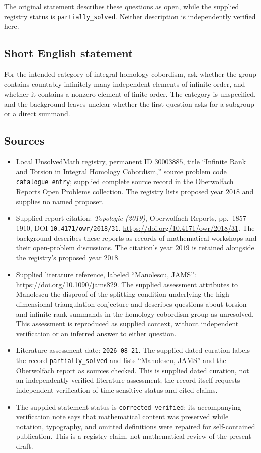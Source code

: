 \documentclass[11pt]{article}
\begin{document}
The original statement describes these questions as open, while the supplied registry status is \texttt{partially\_solved}. Neither description is independently verified here.
\subsection{Short English statement}
For the intended category of integral homology cobordism, ask whether the group contains countably infinitely many independent elements of infinite order, and whether it contains a nonzero element of finite order. The category is unspecified, and the background leaves unclear whether the first question asks for a subgroup or a direct summand.
\subsection{Sources}
\begin{itemize}
\item Local UnsolvedMath registry, permanent ID \(30003885\), title ``Infinite Rank and Torsion in Integral Homology Cobordism,'' source problem code \texttt{catalogue entry}; supplied complete source record in the Oberwolfach Reports Open Problems collection. The registry lists proposed year \(2018\) and supplies no named proposer.
\item Supplied report citation: \emph{Topologie (2019)}, Oberwolfach Reports, pp.\ 1857--1910, DOI \texttt{10.4171/owr/2018/31}. \url{https://doi.org/10.4171/owr/2018/31}. The background describes these reports as records of mathematical workshops and their open-problem discussions. The citation's year \(2019\) is retained alongside the registry's proposed year \(2018\).
\item Supplied literature reference, labeled ``Manolescu, JAMS'': \url{https://doi.org/10.1090/jams829}. The supplied assessment attributes to Manolescu the disproof of the splitting condition underlying the high-dimensional triangulation conjecture and describes questions about torsion and infinite-rank summands in the homology-cobordism group as unresolved. This assessment is reproduced as supplied context, without independent verification or an inferred answer to either question.
\item Literature assessment date: \texttt{2026-08-21}. The supplied dated curation labels the record \texttt{partially\_solved} and lists ``Manolescu, JAMS'' and the Oberwolfach report as sources checked. This is supplied dated curation, not an independently verified literature assessment; the record itself requests independent verification of time-sensitive status and cited claims.
\item The supplied statement status is \texttt{corrected\_verified}; its accompanying verification note says that mathematical content was preserved while notation, typography, and omitted definitions were repaired for self-contained publication. This is a registry claim, not mathematical review of the present draft.
\end{itemize}
\end{document}
